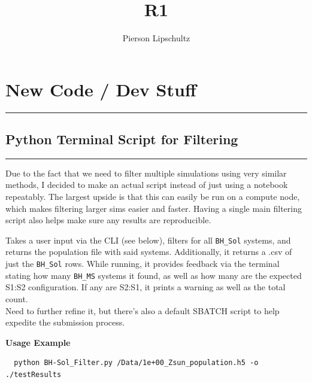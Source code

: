 \documentclass{article}
\title{R1}
\author{Pierson Lipschultz}
\theoremstyle{mytheoremstyle}
\theoremstyle{mytheoremstyle}
\theoremstyle{myproblemstyle}
\theoremstyle{myproblemstyle}
\begin{document}
    \pagestyle{fancy}

    \fancyhf{}
    \fancyfoot[L]{\nouppercase{\leftmark}} %
    \fancyfoot[R]{\thepage}%

    \renewcommand{\headrulewidth}{0pt}
    \renewcommand{\footrulewidth}{0.4pt}
    \renewcommand{\sectionmark}[1]{\markboth{#1}{}}

    \maketitle

\section{New Code / Dev Stuff}
\hrule
\vspace{.5cm}

\subsection{Python Terminal Script for Filtering}
\hrule
\vspace{.5cm}
Due to the fact that we need to filter multiple simulations using very similar methods, I decided to make an actual script instead of just using a notebook repeatably. The largest upside is that this can easily be run on a compute node, which makes filtering larger sims easier and faster. Having a single main filtering script also helps make sure any results are reproducible.

Takes a user input via the CLI (see below), filters for all \verb|BH_Sol| systems, and returns the population file with said systems. Additionally, it returns a .csv of just the \verb|BH_Sol| rows. While running, it provides feedback via the terminal stating how many \verb|BH_MS| systems it found, as well as how many are the expected S1:S2 configuration. If any are S2:S1, it prints a warning as well as the total count.\\

Need to further refine it, but there's also a default SBATCH script to help expedite the submission process.

\textbf{Usage Example}
\begin{verbatim}
  python BH-Sol_Filter.py /Data/1e+00_Zsun_population.h5 -o ./testResults
\end{verbatim}
\end{document}
